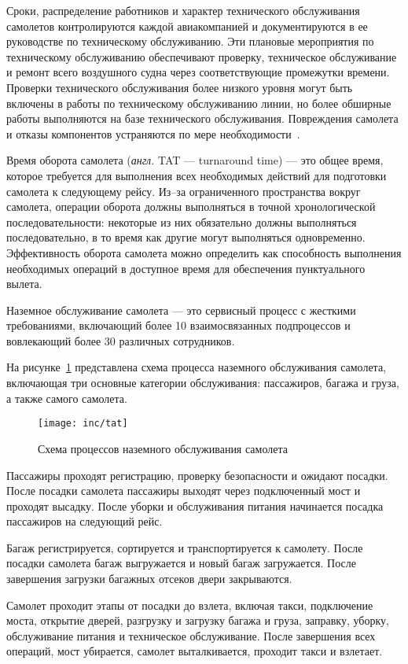 Сроки, распределение работников и характер технического обслуживания самолетов контролируются каждой авиакомпанией и документируются в ее руководстве по техническому обслуживанию.
Эти плановые мероприятия по техническому обслуживанию обеспечивают проверку, техническое обслуживание и ремонт всего воздушного судна через соответствующие промежутки времени.
Проверки технического обслуживания более низкого уровня могут быть включены в работы по техническому обслуживанию линии, но более обширные работы выполняются на базе технического обслуживания.
Повреждения самолета и отказы компонентов устраняются по мере необходимости~\cite{otplane}.

Время оборота самолета (\textit{англ.} TAT --- turnaround time) --- это общее время, которое требуется для выполнения всех необходимых действий для подготовки самолета к следующему рейсу.
Из--за ограниченного пространства вокруг самолета, операции оборота должны выполняться в точной хронологической последовательности: некоторые из них обязательно должны выполняться последовательно, в то время как другие могут выполняться одновременно.
Эффективность оборота самолета можно определить как способность выполнения необходимых операций в доступное время для обеспечения пунктуального вылета.

Наземное обслуживание самолета --- это сервисный процесс с жесткими требованиями, включающий более 10 взаимосвязанных подпроцессов и вовлекающий более 30 различных сотрудников.

На рисунке~\ref{fig:tat} представлена схема процесса наземного обслуживания самолета, включающая три основные категории обслуживания: пассажиров, багажа и груза, а также самого самолета.

\begin{figure}[h]
    \centering
    \texttt{[image: inc/tat]}
    \caption{Схема процессов наземного обслуживания самолета}
    \label{fig:tat}
\end{figure}

Пассажиры проходят регистрацию, проверку безопасности и ожидают посадки.
После посадки самолета пассажиры выходят через подключенный мост и проходят высадку.
После уборки и обслуживания питания начинается посадка пассажиров на следующий рейс.

Багаж регистрируется, сортируется и транспортируется к самолету.
После посадки самолета багаж выгружается и новый багаж загружается.
После завершения загрузки багажных отсеков двери закрываются.

Самолет проходит этапы от посадки до взлета, включая такси, подключение моста, открытие дверей, разгрузку и загрузку багажа и груза, заправку, уборку, обслуживание питания и техническое обслуживание.
После завершения всех операций, мост убирается, самолет выталкивается, проходит такси и взлетает.


